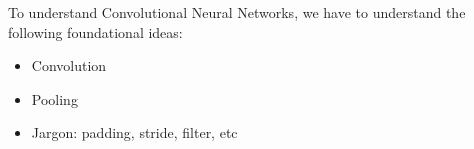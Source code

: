 \doublespacing
\setlength{\parindent}{1cm}

To understand Convolutional Neural Networks, we have to understand the following foundational ideas:

\begin{itemize}
  \item Convolution
  \item Pooling
  \item Jargon: padding, stride, filter, etc
\end{itemize}
